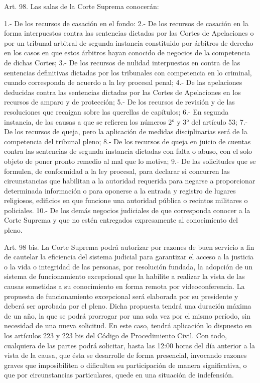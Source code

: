     Art. 98. Las salas de la Corte Suprema conocerán:

    1.- De los recursos de casación en el fondo:
    2.- De los recursos de casación en la forma interpuestos contra las sentencias dictadas por las Cortes de Apelaciones o por un tribunal arbitral de segunda instancia constituido por árbitros de derecho en los casos en que estos árbitros hayan conocido de negocios de la competencia de dichas Cortes;
    3.- De los recursos de nulidad interpuestos en contra de las sentencias definitivas dictadas por los tribunales con competencia en lo criminal, cuando corresponda de acuerdo a la ley procesal penal;
    4.- De las apelaciones deducidas contra las sentencias dictadas por las Cortes de Apelaciones en los recursos de amparo y de protección;
    5.- De los recursos de revisión y de las resoluciones que recaigan sobre las querellas de capítulos;
    6.- En segunda instancia, de las causas a que se refieren los números 2° y 3° del artículo 53;
    7.- De los recursos de queja, pero la aplicación de medidas disciplinarias será de la competencia del tribunal pleno;
    8.- De los recursos de queja en juicio de cuentas contra las sentencias de segunda instancia dictadas con falta o abuso, con el solo objeto de poner pronto remedio al mal que lo motiva;
    9.- De las solicitudes que se formulen, de conformidad a la ley procesal, para declarar si concurren las circunstancias que habilitan a la autoridad requerida para negarse a proporcionar determinada información o para oponerse a la entrada y registro de lugares religiosos, edificios en que funcione una autoridad pública o recintos militares o policiales.
    10.- De los demás negocios judiciales de que corresponda conocer a la Corte Suprema y que no estén entregados expresamente al conocimiento del pleno.


    Art. 98 bis. La Corte Suprema podrá autorizar por razones de buen servicio a fin de cautelar la eficiencia del sistema judicial para garantizar el acceso a la justicia o la vida o integridad de las personas, por resolución fundada, la adopción de un sistema de funcionamiento excepcional que la habilite a realizar la vista de las causas sometidas a su conocimiento en forma remota por videoconferencia. La propuesta de funcionamiento excepcional será elaborada por su presidente y deberá ser aprobada por el pleno. Dicha propuesta tendrá una duración máxima de un año, la que se podrá prorrogar por una sola vez por el mismo período, sin necesidad de una nueva solicitud.
    En este caso, tendrá aplicación lo dispuesto en los artículos 223 y 223 bis del Código de Procedimiento Civil.
    Con todo, cualquiera de las partes podrá solicitar, hasta las 12:00 horas del día anterior a la vista de la causa, que ésta se desarrolle de forma presencial, invocando razones graves que imposibiliten o dificulten su participación de manera significativa, o que por circunstancias particulares, quede en una situación de indefensión.



